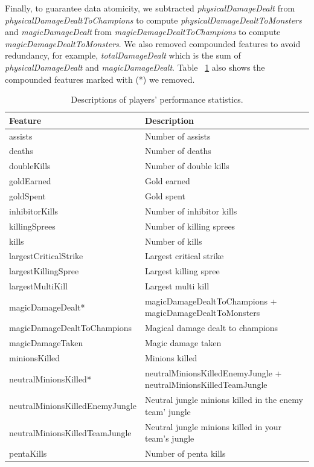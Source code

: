 Finally, to guarantee data atomicity, we subtracted \textit{physicalDamageDealt} from \textit{physicalDamageDealtToChampions} to compute \textit{physicalDamageDealtToMonsters} and \textit{magicDamageDealt} from \textit{magicDamageDealtToChampions} to compute \textit{magicDamageDealtToMonsters}. We also removed compounded features to avoid redundancy, for example, \textit{totalDamageDealt} which is the sum of \textit{physicalDamageDealt} and \textit{magicDamageDealt}. Table ~\ref{tab:features-desc} also shows the compounded features marked with (*) we removed.

\begin{table}
  \tiny
  \caption{Descriptions of players' performance statistics.}
  \label{tab:features-desc}
  \begin{tabular}{p{}p{}}
    \toprule
    Feature & Description \\
    \midrule
assists & Number of assists\\
deaths & Number of deaths\\
doubleKills & Number of double kills\\
goldEarned & Gold earned\\
goldSpent & Gold spent\\
inhibitorKills & Number of inhibitor kills\\
killingSprees & Number of killing sprees\\
kills & Number of kills\\
largestCriticalStrike & Largest critical strike\\
largestKillingSpree & Largest killing spree\\
largestMultiKill & Largest multi kill\\
magicDamageDealt* & magicDamageDealtToChampions +  magicDamageDealtToMonsters\\
magicDamageDealtToChampions & Magical damage dealt to champions\\
magicDamageTaken & Magic damage taken\\
minionsKilled & Minions killed\\
 neutralMinionsKilled* & neutralMinionsKilledEnemyJungle + neutralMinionsKilledTeamJungle\\
neutralMinionsKilledEnemyJungle & Neutral jungle minions killed in the enemy team' jungle\\
neutralMinionsKilledTeamJungle & Neutral jungle minions killed in your team's jungle\\
pentaKills & Number of penta kills\\

\end{tabular}
\end{table}
